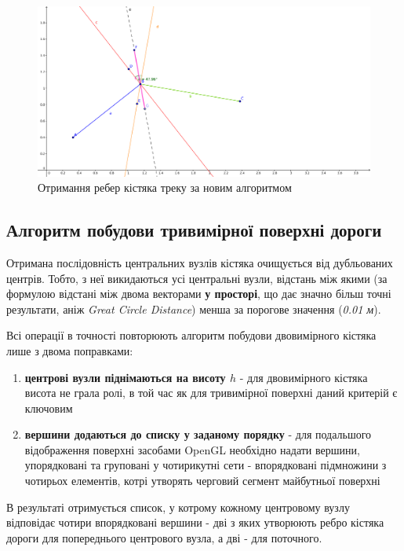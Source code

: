 \documentclass[simple,a4paper,14pt,ukrainian,utf8]{eskdtext}
\begin{document}
		\vspace{3em}
		\begin{figure}
			\centering \includegraphics[scale=0.65]{images/perpendicular_1_1.png}
			\caption{Отримання ребер кістяка треку за новим алгоритмом}
		\end{figure}
	
	\subsection{Алгоритм побудови тривимірної поверхні дороги}
	
		Отримана послідовність центральних вузлів кістяка очищується від дубльованих центрів. Тобто, з неї викидаються усі центральні вузли, відстань між якими (за формулою відстані між двома векторами \textbf{у просторі}, що дає значно більш точні результати, аніж \textit{Great Circle Distance}) менша за порогове значення (\textit{0.01 м}).
		
		Всі операції в точності повторюють алгоритм побудови двовимірного кістяка лише з двома поправками:
		
		\begin{enumerate}
			\item \textbf{центрові вузли піднімаються на висоту $h$} - для двовимірного кістяка висота не грала ролі, в той час як для тривимірної поверхні даний критерій є ключовим
			\item \textbf{вершини додаються до списку у заданому порядку} - для подальшого відображення поверхні засобами OpenGL необхідно надати вершини, упорядковані та груповані у чотирикутні сети - впорядковані підмножини з чотирьох елементів, котрі утворять черговий сегмент майбутньої поверхні
		\end{enumerate}
		
		В результаті отримується список, у котрому кожному центровому вузлу відповідає чотири впорядковані вершини - дві з яких утворюють ребро кістяка дороги для попереднього центрового вузла, а дві - для поточного.
	
\end{document}
